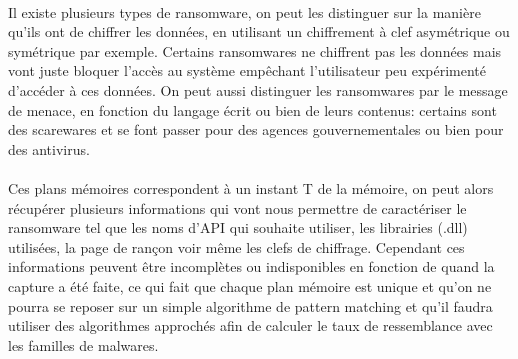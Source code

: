 \documentclass[a4paper, 12pt, twoside]{article}
\begin{document}
\begin{figure}[h]
\end{figure}

\paragraph{}
Il existe plusieurs types de ransomware, on peut les distinguer sur la manière qu'ils ont de chiffrer les données, en utilisant un chiffrement à clef asymétrique ou symétrique par exemple. Certains ransomwares ne chiffrent pas les données mais vont juste bloquer l'accès au système empêchant l'utilisateur peu expérimenté d'accéder à ces données. On peut aussi distinguer les ransomwares par le message de menace, en fonction du langage écrit ou bien de leurs contenus: certains sont des scarewares et se font passer pour des agences gouvernementales ou bien pour des antivirus.
\paragraph{}
Ces plans mémoires correspondent à un instant T de la mémoire, on peut alors récupérer plusieurs informations qui vont nous permettre de caractériser le ransomware tel que les noms d’API qui souhaite utiliser, les librairies (.dll) utilisées, la page de rançon voir même les clefs de chiffrage. Cependant ces informations peuvent être incomplètes ou indisponibles en fonction de quand la capture a été faite, ce qui fait que chaque plan mémoire est unique et qu’on ne pourra se reposer sur un simple algorithme de pattern matching et qu'il faudra utiliser des algorithmes approchés afin de calculer le taux de ressemblance avec les familles de malwares.
\newpage
\end{document}
